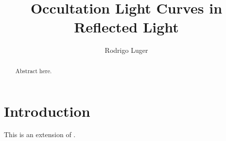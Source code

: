 \documentclass[modern]{aastex62}
\begin{document}
\title{Occultation Light Curves in Reflected Light}

\author[0000-0002-0296-3826]{Rodrigo Luger}
%

\begin{abstract}
    Abstract here.
    \href{https://github.com/rodluger/starrynight}{\color{linkcolor}\faGithub}
\end{abstract}

%
\section{Introduction}
\label{sec:intro}
%
This is an extension of \citet{Luger2019}.

\pagebreak

%
\end{document}
